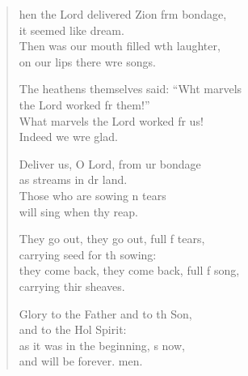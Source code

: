 \begin{verse}
  \begin{patverse}
hen the Lord delivered Zion frm bondage,\Med\\
it seemed like  dream.\\
Then was our mouth filled w\pointup{\i}th laughter,\Med\\
on our lips there wre songs.

The heathens themselves said: “Wht marvels\Med\\
the Lord worked fr them!”\\
What marvels the Lord worked fr us!\Med\\
Indeed we wre glad.

Deliver us, O Lord, from ur bondage\Med\\
as streams in dr land.\\
Those who are sowing \pointup{\i}n tears\Med\\
will sing when thy reap.

They go out, they go out, full f tears,\Med\\
carrying seed for th sowing:\\
they come back, they come back, full f song,\Med\\
carrying thir sheaves.

Glory to the Father and to th Son,\Med\\
and to the Hol Spirit:\\
as it was in the beginning, \pointup{\i}s now,\Med\\
and will be forever. men. 
  \end{patverse}
\end{verse}
